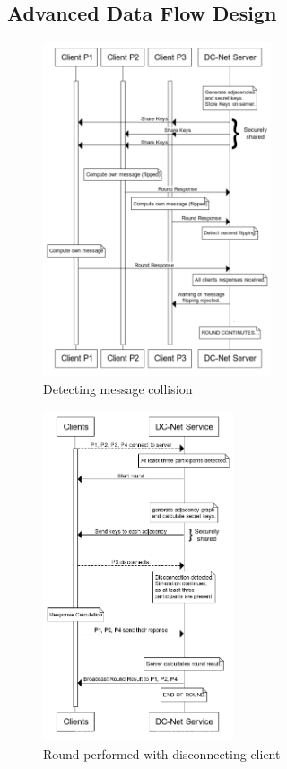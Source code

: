 \subsection{Advanced Data Flow Design}


\begin{figure}[H]
    \centering
    \includegraphics[width=0.6\textwidth]{Images/Design/collisionDetection.png}
    \caption{Detecting message collision}
    \label{fig:collisionDetection}
\end{figure}

\begin{figure}[H]
    \centering
    \includegraphics[width=0.5\textwidth]{Images/Design/roundWithDisconnections.png}
    \caption{Round performed with disconnecting client}
    \label{fig:roundWithDisconnections}
\end{figure}

